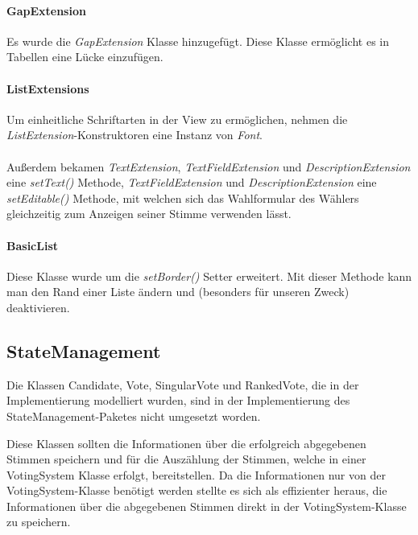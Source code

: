 \documentclass[parskip=full]{scrartcl}
\begin{document}
\paragraph{GapExtension}
Es wurde die \textit{GapExtension} Klasse hinzugefügt. Diese Klasse ermöglicht es in Tabellen eine Lücke einzufügen.

\paragraph{ListExtensions}
Um einheitliche Schriftarten in der View zu ermöglichen, nehmen die \textit{ListExtension}-Konstruktoren eine Instanz von \textit{Font}.
\\
\\
Außerdem bekamen \textit{TextExtension}, \textit{TextFieldExtension} und \textit{DescriptionExtension} eine \textit{setText()} Methode, \textit{TextFieldExtension} und \textit{DescriptionExtension} eine \textit{setEditable()} Methode, mit welchen sich das Wahlformular des Wählers gleichzeitig zum Anzeigen seiner Stimme verwenden lässt.

\paragraph{BasicList}
Diese Klasse wurde um die \textit{setBorder()} Setter erweitert. Mit dieser Methode kann man den Rand einer Liste ändern und (besonders für unseren Zweck) deaktivieren.

\subsection{StateManagement}
Die Klassen Candidate, Vote, SingularVote und RankedVote, die in der Implementierung modelliert wurden, sind in der Implementierung des StateManagement-Paketes nicht umgesetzt worden.

Diese Klassen sollten die Informationen über die erfolgreich abgegebenen Stimmen speichern und für die Auszählung der Stimmen, welche in einer VotingSystem Klasse erfolgt, bereitstellen.
Da die Informationen nur von der VotingSystem-Klasse benötigt werden
stellte es sich als effizienter heraus, die Informationen über die abgegebenen Stimmen direkt in der VotingSystem-Klasse zu speichern.

\end{document}
